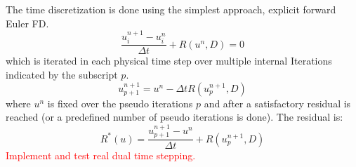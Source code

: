 \documentclass[10pt]{article}
\begin{document}
The time discretization is done using the simplest approach, explicit forward Euler FD.
\begin{equation}
\frac{u_i^{n+1} - u_i^n}{\Delta t} + R(u^n,D) = 0
\end{equation}
which is iterated in each physical time step over multiple internal Iterations indicated by the subscript $p$.
\begin{equation}
u^{n+1}_{p+1} = u^n - \Delta t R(u^{n+1}_{p},D)
\end{equation} 
where $u^n$ is fixed over the pseudo iterations $p$ and after a satisfactory residual is reached (or a predefined number of pseudo iterations is done). The residual is:
\begin{equation}
R^*(u) = \frac{u^{n+1}_{p+1} - u^n}{\Delta t} +  R(u^{n+1}_{p},D)
\end{equation}
\textcolor{red}{Implement and test real dual time stepping.}
\end{document}
